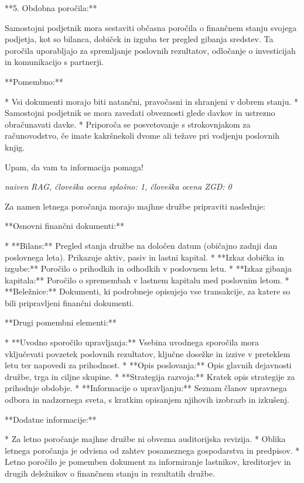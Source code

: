\documentclass[a4paper,12pt,openright]{book}
\begin{document}
**5. Obdobna poročila:**

Samostojni podjetnik mora sestaviti občasna poročila o finančnem stanju svojega podjetja, kot so bilanca, dobiček in izguba ter pregled gibanja sredstev. Ta poročila uporabljajo za spremljanje poslovnih rezultatov, odločanje o investicijah in komunikacijo s partnerji.

**Pomembno:**

* Vsi dokumenti morajo biti natančni, pravočasni in shranjeni v dobrem stanju.
* Samostojni podjetnik se mora zavedati obveznosti glede davkov in ustrezno obračunavati davke.
* Priporoča se posvetovanje s strokovnjakom za računovodstvo, če imate kakršnekoli dvome ali težave pri vodjenju poslovnih knjig.


Upam, da vam ta informacija pomaga!

\vspace{0.5cm}
\textit{naiven RAG, človeška ocena splošno: 1, človeška ocena ZGD: 0}

Za namen letnega poročanja morajo majhne družbe pripraviti naslednje:

**Osnovni finančni dokumenti:**

* **Bilans:**  Pregled stanja družbe na določen datum (običajno zadnji dan poslovnega leta). Prikazuje aktiv, pasiv in lastni kapital.
* **Izkaz dobička in izgube:**  Poročilo o prihodkih in odhodkih v poslovnem letu.
* **Izkaz gibanja kapitala:** Poročilo o spremembah v lastnem kapitalu med poslovnim letom.
* **Beležnice:** Dokumenti, ki podrobneje opisujejo vse transakcije, za katere so bili pripravljeni finančni dokumenti.

**Drugi pomembni elementi:**

* **Uvodno sporočilo upravljanja:**  Vsebina uvodnega sporočila mora vključevati povzetek poslovnih rezultatov, ključne dosežke in izzive v preteklem letu ter napovedi za prihodnost.
* **Opis poslovanja:** Opis glavnih dejavnosti družbe, trga in ciljne skupine.
* **Strategija razvoja:** Kratek opis strategije za prihodnje obdobje.
* **Informacije o upravljanju:** Seznam članov upravnega odbora in nadzornega sveta, s kratkim opisanjem njihovih izobrazb in izkušenj.

**Dodatne informacije:**

* Za letno poročanje majhne družbe ni obvezna auditorijska revizija.
* Oblika letnega poročanja je odvisna od zahtev posameznega gospodarstva in predpisov.
* Letno poročilo je pomemben dokument za informiranje lastnikov, kreditorjev in drugih deležnikov o finančnem stanju in rezultatih družbe.
\end{document}
